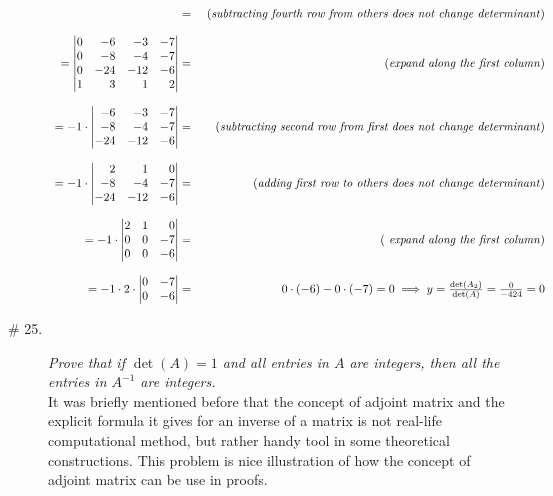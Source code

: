 \documentclass[8pt]{article} %
\begin{document}
\begin{description}
{\[\begin{array}{rr}
			= &\mbox{ (\textit{subtracting fourth row from others does not change determinant})}\\\\
			=\begin{vmatrix*}[r]0&{-6}&-3&-7\\0&{-8}&-4&-7\\0&{-24}&-12&-6\\1&{3}&1&2\end{vmatrix*}
			= &\mbox{ (\textit{expand along the first column})}\\\\
			=-1\cdot\begin{vmatrix*}[r]{-6}&-3&-7\\{-8}&-4&-7\\{-24}&-12&-6\end{vmatrix*}
			= &\mbox{ (\textit{subtracting second row from first does not change determinant})}\\\\
			=-1\cdot\begin{vmatrix*}[r]2&1&0\\{-8}&-4&-7\\{-24}&-12&-6\end{vmatrix*}
			= &\mbox{ (\textit{adding first row to others does not change determinant})}\\\\
			=-1\cdot\begin{vmatrix*}[r]2&1&0\\0&0&-7\\0&0&-6\end{vmatrix*}
			= &\mbox{ (\textit{ expand along the first column})}\\\\
			=-1\cdot2\cdot\begin{vmatrix*}[r]0&-7\\0&-6\end{vmatrix*}
			=&0\cdot(-6)-0\cdot(-7)=0\implies y=\frac{\det(A_2)}{\det(A)}=\frac{0}{-424}=0
			\end{array}\]
		}
	\item[\# 25.]{{\it Prove that if $\det(A)=1$ and all entries in $A$ are integers, then all the entries in $A^{-1}$ are integers.}\\
		It was briefly mentioned before that the concept of adjoint matrix and the explicit formula it gives for an inverse of a matrix
		is not real-life computational method, but rather handy tool in some theoretical constructions. This problem is nice illustration
		of how the concept of adjoint matrix can be use in proofs.\\
}
\end{description}
\end{document}
